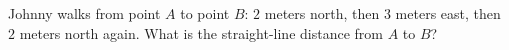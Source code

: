 Johnny walks from point $A$ to point $B$: $2$ meters north, then $3$ meters east, then $2$ meters north again. What is the straight-line distance from $A$ to $B$?
